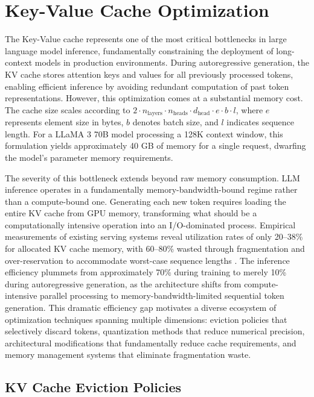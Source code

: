 \section{Key-Value Cache Optimization}
\label{sec:kvcache}

The Key-Value cache represents one of the most critical bottlenecks in large language model inference, fundamentally constraining the deployment of long-context models in production environments. During autoregressive generation, the KV cache stores attention keys and values for all previously processed tokens, enabling efficient inference by avoiding redundant computation of past token representations. However, this optimization comes at a substantial memory cost. The cache size scales according to $2 \cdot n_{\text{layers}} \cdot n_{\text{heads}} \cdot d_{\text{head}} \cdot e \cdot b \cdot l$, where $e$ represents element size in bytes, $b$ denotes batch size, and $l$ indicates sequence length. For a LLaMA 3 70B model processing a 128K context window, this formulation yields approximately 40 GB of memory for a single request, dwarfing the model's parameter memory requirements.

The severity of this bottleneck extends beyond raw memory consumption. LLM inference operates in a fundamentally memory-bandwidth-bound regime rather than a compute-bound one. Generating each new token requires loading the entire KV cache from GPU memory, transforming what should be a computationally intensive operation into an I/O-dominated process. Empirical measurements of existing serving systems reveal utilization rates of only 20--38\% for allocated KV cache memory, with 60--80\% wasted through fragmentation and over-reservation to accommodate worst-case sequence lengths \citep{kwon2023efficient}. The inference efficiency plummets from approximately 70\% during training to merely 10\% during autoregressive generation, as the architecture shifts from compute-intensive parallel processing to memory-bandwidth-limited sequential token generation. This dramatic efficiency gap motivates a diverse ecosystem of optimization techniques spanning multiple dimensions: eviction policies that selectively discard tokens, quantization methods that reduce numerical precision, architectural modifications that fundamentally reduce cache requirements, and memory management systems that eliminate fragmentation waste.

\subsection{KV Cache Eviction Policies}

